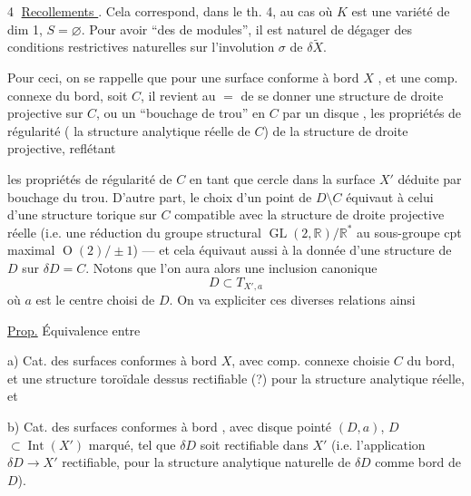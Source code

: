 \textcircled{4} \uline{Recollements }.
Cela correspond,
dans le th. 4, au cas où $K$ est une
variété  de dim 1, $S=\varnothing$.  Pour avoir
``des  de modules'', il est naturel
de dégager des conditions restrictives
naturelles sur l'involution $\sigma$ de
$\delta\widetilde X$.

Pour ceci,  on se rappelle que
pour une surface conforme à bord $X$
, et une comp. connexe du bord, soit $C$,
il revient au $=$ de se donner une
structure de droite projective  sur $C$,
ou un ``bouchage de trou'' en $C$
par un disque , les propriétés de régularité
( la structure analytique réelle de $C$)
de la structure de droite projective, reflétant

les propriétés de régularité de $C$ en tant que
cercle  dans la surface  $X'$ déduite
par bouchage du trou. D'autre part,
le choix d'un point de $D\setminus C$ équivaut
à celui d'une structure torique
sur $C$ compatible avec la structure de
droite projective réelle (i.e. une réduction
du groupe structural 
$\operatorname{GL}(2,\mathbb R)/\mathbb R^*$
au sous-groupe cpt maximal $\operatorname O(2)/\pm1$)
--- et cela équivaut aussi à la donnée
d'une structure  de $D$ sur 
$\delta D=C$. Notons que l'on aura alors une
inclusion canonique
\[
D\subset T_{X',a}
\]
où $a$ est le centre choisi de $D$. On
va expliciter  ces diverses
relations ainsi

\uline{Prop.} Équivalence entre 

a) Cat. des surfaces conformes à bord $X$,
avec comp. connexe  choisie $C$ du bord,
et une structure toroïdale dessus
rectifiable (?) pour la structure
analytique réelle, et

b) Cat. des surfaces conformes à
bord , avec  disque pointé $(D,a)$, $D$
$\subset\operatorname{Int}(X')$ marqué, tel que $\delta D$ soit rectifiable
dans $X'$ (i.e. l'application $\delta D\longrightarrow X'$
rectifiable, pour la structure analytique
naturelle de $\delta D$ comme bord de $D$).

